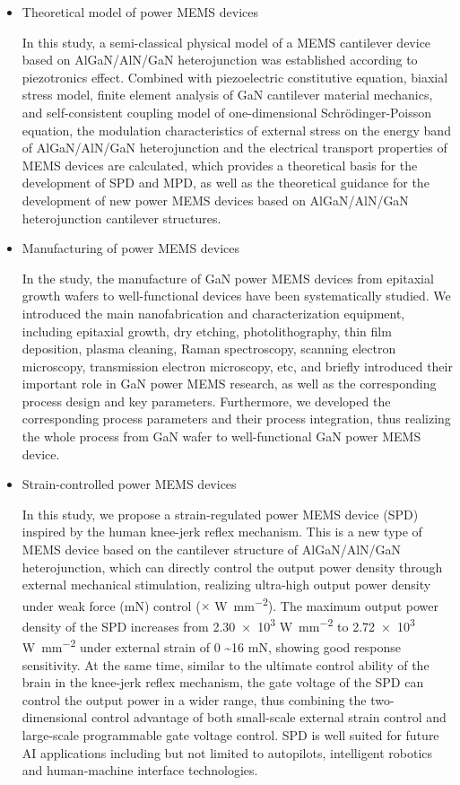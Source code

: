 \begin{itemize}
	\item [1.] Theoretical model of power MEMS devices
	
In this study, a semi-classical physical model of a MEMS cantilever device based on AlGaN/AlN/GaN heterojunction was established according to piezotronics effect. Combined with piezoelectric constitutive equation, biaxial stress model, finite element analysis of GaN cantilever material mechanics, and self-consistent coupling model of one-dimensional Schrödinger-Poisson equation, the modulation characteristics of external stress on the energy band of AlGaN/AlN/GaN heterojunction and the electrical transport properties of MEMS devices are calculated, which provides a theoretical basis for the development of SPD and MPD, as well as the theoretical guidance for the development of new power MEMS devices based on AlGaN/AlN/GaN heterojunction cantilever  structures.\\


  \item [2.] Manufacturing of power MEMS devices

In the study, the manufacture of GaN power MEMS devices from epitaxial growth wafers to well-functional devices have been systematically studied. We introduced the main nanofabrication and characterization equipment, including epitaxial growth, dry etching, photolithography, thin film deposition, plasma cleaning, Raman spectroscopy, scanning electron microscopy, transmission electron microscopy, etc, and briefly introduced their important role in GaN power MEMS research, as well as the corresponding process design and key parameters. Furthermore, we developed the corresponding process parameters and their process integration, thus realizing the whole process from GaN wafer to well-functional GaN power MEMS device.\\

\item [3.] Strain-controlled power MEMS devices

In this study, we propose a strain-regulated power MEMS device (SPD) inspired by the human knee-jerk reflex mechanism. This is a new type of MEMS device based on the cantilever  structure of AlGaN/AlN/GaN heterojunction, which can directly control the output power density through external mechanical stimulation, realizing ultra-high output power density under weak force (\unit{\mN}) control ($\times$ \unit{\W\per\square\mm}). The maximum output power density of the SPD increases from \num{2.30e3} \unit{\W\per\square\mm} to \num{2.72e3} \unit{\W\per\square\mm} under external strain of 0 \sim 16 \unit{\mN}, showing good response sensitivity. At the same time, similar to the ultimate control ability of the brain in the knee-jerk reflex mechanism, the gate voltage of the SPD can control the output power in a wider range, thus combining the two-dimensional control advantage of both small-scale external strain control and large-scale programmable gate voltage control. SPD is well suited for future AI applications including but not limited to autopilots, intelligent robotics and human-machine interface technologies.\\


\end{itemize}
